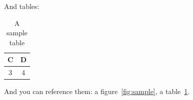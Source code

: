 And tables:
\begin{table}[H]
	\centering
	\begin{tabular}{|c|c|}
		\hline
		C & D \\ \hline
		3 & 4 \\ \hline
	\end{tabular}
	\caption{A sample table}
	\label{tab:sample}
\end{table}

And you can reference them: a figure~\ref{fig:sample}, a table~\ref{tab:sample}.


